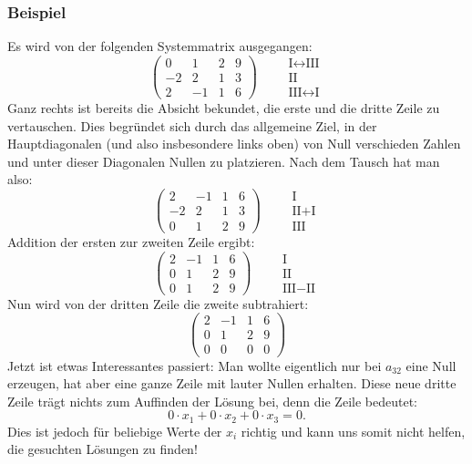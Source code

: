 \subsubsection{Beispiel}

Es wird von der folgenden Systemmatrix ausgegangen:
\[ \left(\begin{array}{ccc|c} 0 & 1 & 2 & 9\\ -2 & 2 & 1 & 3\\ 2 & -1 & 1 & 6 \end{array}\right) \qquad \begin{array}{l} \text{I}\leftrightarrow\text{III}\\ \text{II}\\ \text{III}\leftrightarrow\text{I} \end{array} \]
Ganz rechts ist bereits die Absicht bekundet, die erste und die dritte Zeile zu vertauschen. Dies begründet sich durch das allgemeine Ziel, in der Hauptdiagonalen (und also insbesondere links oben) von Null verschieden Zahlen und unter dieser Diagonalen Nullen zu platzieren. Nach dem Tausch hat man also:
\[ \left(\begin{array}{ccc|c} 2 & -1 & 1 & 6\\ -2 & 2 & 1 & 3\\ 0 & 1 & 2 & 9 \end{array}\right) \qquad \begin{array}{l} \text{I}\\ \text{II}+\text{I}\\ \text{III} \end{array} \]
Addition der ersten zur zweiten Zeile ergibt:
\[ \left(\begin{array}{ccc|c} 2 & -1 & 1 & 6\\ 0 & 1 & 2 & 9\\ 0 & 1 & 2 & 9 \end{array}\right) \qquad \begin{array}{l} \text{I}\\ \text{II}\\ \text{III}-\text{II} \end{array} \]
Nun wird von der dritten Zeile die zweite subtrahiert:
\[ \left(\begin{array}{ccc|c} 2 & -1 & 1 & 6\\ 0 & 1 & 2 & 9\\ 0 & 0 & 0 & 0 \end{array}\right) \]
Jetzt ist etwas Interessantes passiert: Man wollte eigentlich nur bei $a_{32}$ eine Null erzeugen, hat aber eine ganze Zeile mit lauter Nullen erhalten. Diese neue dritte Zeile trägt nichts zum Auffinden der Lösung bei, denn die Zeile bedeutet:
\[ 0 \cdot x_1 + 0 \cdot x_2 + 0 \cdot x_3 = 0 . \]
Dies ist jedoch für beliebige Werte der $x_i$ richtig und kann uns somit nicht helfen, die gesuchten Lösungen zu finden!


